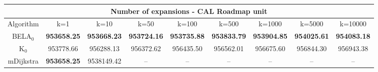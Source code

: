 \begin{tabular}{c|cccccccc}\toprule
\multicolumn{9}{c}{Number of expansions - CAL Roadmap unit}\\ \midrule
Algorithm & k=1 & k=10 & k=50 & k=100 & k=500 & k=1000 & k=5000 & k=10000 \\ \midrule
BELA$_0$ & \textbf{953658.25} & \textbf{953668.23} & \textbf{953724.16} & \textbf{953735.88} & \textbf{953833.79} & \textbf{953904.85} & \textbf{954025.61} & \textbf{954083.18} \\
K$_0$ & 953778.66 & 956288.13 & 956372.62 & 956435.50 & 956562.01 & 956675.60 & 956844.30 & 956943.38 \\
mDijkstra & \textbf{953658.25} & 9538149.42 & -- & -- & -- & -- & -- & -- \\ \bottomrule 
\end{tabular}
